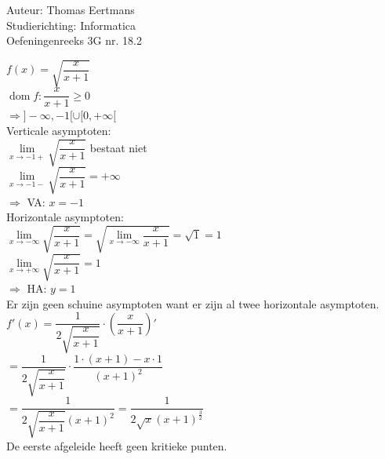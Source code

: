 \documentclass[a4paper]{article}
\begin{document}
  
\noindent \large Auteur: Thomas Eertmans \\
\noindent \large Studierichting: Informatica\\
\noindent \large Oefeningenreeks 3G nr. 18.2\\

\medskip

\normalsize

$f(x) = \sqrt{\dfrac{x}{x+1}}$ \\

$\operatorname{dom} f: \dfrac{x}{x+1} \geq 0$ \\

$\Rightarrow ]-\infty,-1[ \cup [0,+\infty[$ \\

Verticale asymptoten: \\

$\lim\limits_{x\rightarrow-1+} \sqrt{\dfrac{x}{x+1}}$ bestaat niet \\

$\lim\limits_{x\rightarrow-1-} \sqrt{\dfrac{x}{x+1}} = +\infty$ \\

$\Rightarrow$ VA: $x=-1$ \\

Horizontale asymptoten: \\

$\lim\limits_{x\rightarrow-\infty} \sqrt{\dfrac{x}{x+1}} = \sqrt{\lim\limits_{x\rightarrow-\infty} \dfrac{x}{x+1}} = \sqrt{1} = 1$ \\

$\lim\limits_{x\rightarrow+\infty} \sqrt{\dfrac{x}{x+1}} = 1$ \\

$\Rightarrow$ HA: $y=1$ \\

Er zijn geen schuine asymptoten want er zijn al twee horizontale asymptoten. \\

$f'(x) = \dfrac{1}{2\sqrt{\dfrac{x}{x+1}}} \cdot (\dfrac{x}{x+1})'$ \\

$= \dfrac{1}{2\sqrt{\dfrac{x}{x+1}}} \cdot \dfrac{1 \cdot (x+1) - x \cdot 1}{(x+1)^2}$ \\

$= \dfrac{1}{2\sqrt{\dfrac{x}{x+1}}(x+1)^2} = \dfrac{1}{2\sqrt{x}(x+1)^{\tfrac{3}{2}}}$ \\

De eerste afgeleide heeft geen kritieke punten. \\
\end{document}
